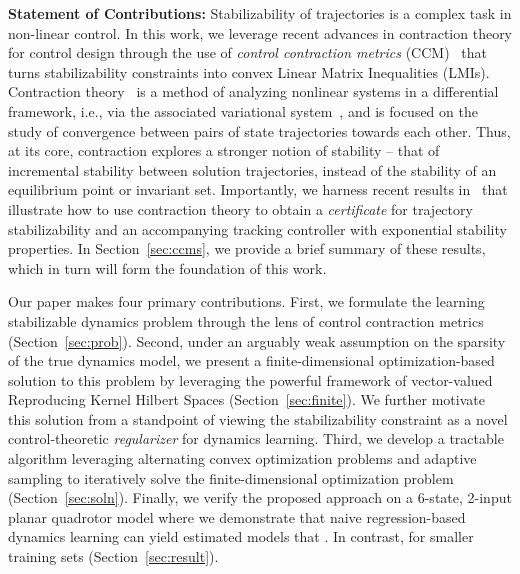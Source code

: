 \documentclass[conference]{svproc}
\newcommand{\revision}[1]{{\color{black}{#1}}}
\begin{document}



{\bf Statement of Contributions:} Stabilizability of trajectories is a complex task in non-linear control. In this work, we leverage recent advances in contraction theory for control design through the use of \emph{control contraction metrics} (CCM)~\cite{ManchesterSlotine2017} that turns stabilizability constraints into convex Linear Matrix Inequalities (LMIs). Contraction theory~\cite{LohmillerSlotine1998} is a method of analyzing nonlinear systems in a differential framework, i.e., via the associated variational system~\cite[Chp 3]{CrouchSchaft1987}, and is focused on the study of convergence between pairs of state trajectories towards each other. Thus, at its core, contraction explores a stronger notion of stability -- that of incremental stability between solution trajectories, instead of the stability of an equilibrium point or invariant set. Importantly, we harness recent results in~\cite{ManchesterTangEtAl2015,ManchesterSlotine2017,SinghMajumdarEtAl2017} that illustrate how to use contraction theory to obtain a \emph{certificate} for trajectory stabilizability and an accompanying tracking controller with exponential stability properties. In Section~\ref{sec:ccms}, we provide a brief summary of these results, which in turn will form the foundation of this work.
 
 Our paper makes four primary contributions. First, we formulate the learning stabilizable dynamics problem through the lens of control contraction metrics (Section~\ref{sec:prob}). Second, under an arguably weak assumption on the sparsity of the true dynamics model, we present a finite-dimensional optimization-based solution to this problem by leveraging the powerful framework of vector-valued Reproducing Kernel Hilbert Spaces (Section~\ref{sec:finite}). We further motivate this solution from a standpoint of viewing the stabilizability constraint as a novel control-theoretic \emph{regularizer} for dynamics learning. Third, we develop a tractable algorithm leveraging alternating convex optimization problems and adaptive sampling to iteratively solve the finite-dimensional optimization problem (Section~\ref{sec:soln}). Finally, we verify the proposed approach on a 6-state, 2-input planar quadrotor model where we demonstrate that naive regression-based dynamics learning can yield estimated models that \revision{generate completely unstabilizable trajectories}. In contrast, \revision{the control-theoretic regularized model generates vastly superior quality, trackable trajectories, especially} for smaller training sets (Section~\ref{sec:result}).
\end{document}
